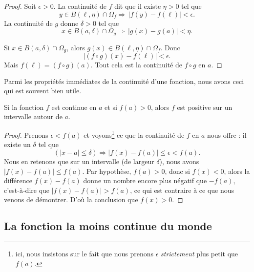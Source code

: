\begin{proof}
	Soit \( \epsilon>0\). La continuité de \( f\) dit que il existe \( \eta>0\) tel que
	\begin{equation}
		y\in B(\ell,\eta)\cap\Omega_f\Rightarrow\,| f(y)-f(\ell) |<\epsilon.
	\end{equation}
	La continuité de \( g\) donne \( \delta>0\) tel que
	\begin{equation}
		x\in B(a,\delta)\cap\Omega_g\Rightarrow\,| g(x)-g(a) |<\eta.
	\end{equation}

	Si \( x\in B(a,\delta)\cap\Omega_g\), alors \( g(x)\in B(\ell,\eta)\cap\Omega_f\). Donc
	\begin{equation}
		| (f\circ g)(x)-f(\ell) |<\epsilon.
	\end{equation}
	Mais \( f(\ell)=(f\circ g)(a)\). Tout cela est la continuité de \( f\circ g\) en \( a\).
\end{proof}


Parmi les propriétés immédiates de la continuité d'une fonction, nous avons ceci qui est souvent bien utile.

\begin{corollary}   \label{CorNNPYooMbaYZg}
	Si la fonction \( f\) est continue en \( a\) et si \( f(a)>0\), alors \( f\) est positive sur un intervalle autour de \( a\).
\end{corollary}

\begin{proof}
	Prenons \( \epsilon<f(a)\) et voyons\footnote{ici, nous insistons sur le fait que nous prenons \( \epsilon\) \emph{strictement} plus petit que \( f(a)\).} ce que la continuité de \( f\) en \( a\) nous offre : il existe un \( \delta\) tel que
	\[
		(| x-a |\leq \delta)\Rightarrow | f(x)-f(a) |\leq\epsilon < f(a).
	\]
	Nous en retenons que sur un intervalle (de largeur \( \delta\)), nous avons \( | f(x)-f(a) |\leq f(a)\). Par hypothèse, \( f(a)>0\), donc si \( f(x)<0\), alors la différence \( f(x)-f(a)\) donne un nombre encore plus négatif que \( -f(a)\), c'est-à-dire que \( | f(x)-f(a) |>f(a)\), ce qui est contraire à ce que nous venons de démontrer. D'où la conclusion que \( f(x)>0\).
\end{proof}

\subsection{La fonction la moins continue du monde}

